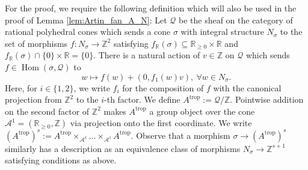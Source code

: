 \documentclass[11pt]{article}
\DeclareMathOperator{\Hom}{Hom}
\newcommand{\trop}{\mathrm{trop}}
\newcommand{\tropA}{{A^{\trop}}}
\theoremstyle{definition}
\begin{document}
For the proof, we require the following definition which will also be used in the proof of Lemma \ref{lem:Artin_fan_A_N}:
Let $\mathcal{Q}$ be the sheaf on the category of rational polyhedral cones which sends a cone $\sigma$ with integral structure $N_{\sigma}$ to
the set of morphisms $f:N_{\sigma}\to \mathbb{Z}^{2}$ satisfying
$f_{\mathbb{R}}(\sigma)\subseteq \mathbb{R}_{\ge 0}\times \mathbb{R}$ and
$f_{\mathbb{R}}(\sigma)\cap \{0\}\times \mathbb{R}=\{0\}$. There is a natural action of $v\in \mathbb{Z}$ on $\mathcal{Q}$
which sends $f\in \Hom(\sigma,\mathcal{Q})$ to
$$w\mapsto f(w)+(0,f_1(w)v),\ \forall w\in N_{\sigma}.$$
Here, for $i\in \{1,2\}$, we write $f_i$ for the composition of $f$
with the canonical projection from $\mathbb{Z}^{2}$ to the $i$-th factor.
We define $\tropA:=\mathcal{Q}/\mathbb{Z}$.
Pointwise addition on the second factor of $\mathbb{Z}^2$ makes
$\tropA$ a group object over the cone $\mathcal{A}^{1}=(\mathbb{R}_{\ge 0},\mathbb{Z})$ via projection onto the first coordinate.
We write $(\tropA)^{s}:=\tropA\times_{\mathcal{A}^{1}}\dots\times_{\mathcal{A}^{1}}\tropA$. Observe that a morphism $\sigma\to (\tropA)^{s}$
similarly has a description as an equivalence class of morphisms $N_{\sigma}\to \mathbb{Z}^{s+1}$ satisfying conditions as above.
\end{document}
